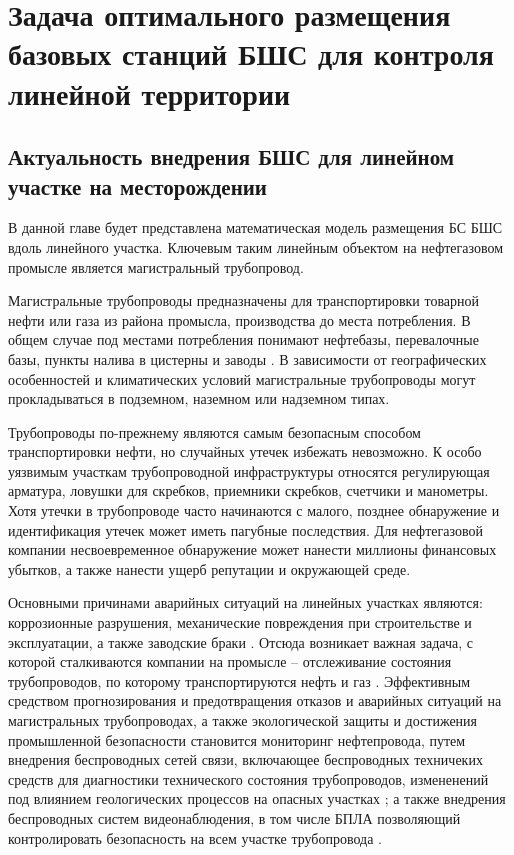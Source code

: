 \chapter{Задача оптимального размещения базовых станций БШС для контроля линейной территории}\label{chapter_linear_network}
\section{Актуальность внедрения БШС для линейном участке на месторождении}

В данной главе будет представлена математическая модель размещения БС БШС вдоль линейного участка. Ключевым таким линейным объектом на нефтегазовом промысле является магистральный трубопровод. 

Магистральные трубопроводы предназначены для транспортировки товарной нефти или газа из района промысла, производства до места потребления. В общем случае под местами потребления понимают нефтебазы, перевалочные базы, пункты налива в цистерны и заводы \cite{Deineko2018}. В зависимости от географических особенностей и климатических условий магистральные трубопроводы могут прокладываться в подземном, наземном или надземном типах.

Трубопроводы по-прежнему являются самым безопасным способом транспортировки нефти, но случайных утечек избежать невозможно.  К особо уязвимым участкам трубопроводной инфраструктуры относятся регулирующая арматура, ловушки для скребков, приемники скребков, счетчики и манометры.
Хотя утечки в трубопроводе часто начинаются с малого, позднее обнаружение и идентификация утечек может иметь пагубные последствия. Для нефтегазовой компании несвоевременное обнаружение может нанести миллионы финансовых убытков, а также нанести ущерб репутации и окружающей среде.

Основными причинами аварийных ситуаций на линейных участках являются: коррозионные разрушения, механические повреждения при строительстве и эксплуатации, а также заводские браки \cite{Deineko2018_alone}. Отсюда возникает важная задача, с которой сталкиваются компании на промысле -- отслеживание состояния трубопроводов, по которому транспортируются нефть и газ \cite{Aalsalem2018}. Эффективным средством прогнозирования и предотвращения отказов и аварийных ситуаций на магистральных трубопроводах, а также экологической защиты и достижения промышленной безопасности становится мониторинг нефтепровода, путем внедрения беспроводных сетей связи, включающее беспроводных техничеких средств для диагностики технического состояния трубопроводов, измененений под влиянием геологических процессов на опасных участках \cite{Krzyszton2021,Mehmood2016, Lin2019, Adegboye2019}; а также внедрения беспроводных систем видеонаблюдения, в том числе БПЛА позволяющий контролировать безопасность на всем участке трубопровода \cite{Fedorova2020, Aljuaid2020, Adegboye2019, Gomez2017, Fawzi2019}.


